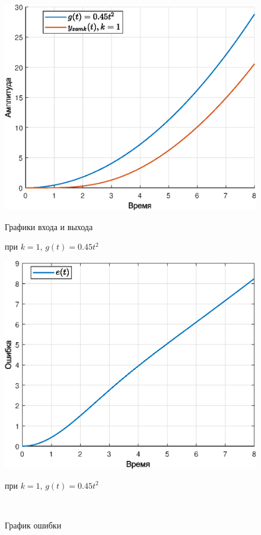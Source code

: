 \documentclass[a4paper]{article}
\begin{document}
\begin{figure}[H]
    \begin{minipage}{0.5\textwidth}
        \centering \includegraphics[width=\textwidth]{ex4/k1_g_at2.eps}
        \caption{Графики входа и выхода}
        \centerline{при $k=1$, $g(t)=0.45t^2$}
    \end{minipage}\hfill
    \begin{minipage}{0.5\textwidth}
        \centering \includegraphics[width=\textwidth]{ex4/k1_g_at2_error.eps}
        \caption{График ошибки}
        \centerline{при $k=1$, $g(t)=0.45t^2$}
    \end{minipage}\\[1em]
\end{figure}\noindent\
\end{document}
